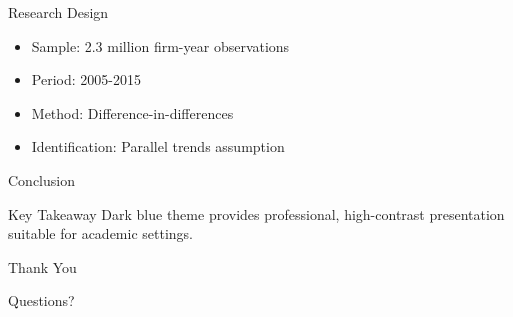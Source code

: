 \documentclass{beamer}
\begin{document}
\begin{frame}{Research Design}
  \begin{itemize}
    \item Sample: 2.3 million firm-year observations
    \item Period: 2005-2015
    \item Method: Difference-in-differences
    \item Identification: Parallel trends assumption
  \end{itemize}
\end{frame}

\begin{frame}{Conclusion}
  \begin{block}{Key Takeaway}
    Dark blue theme provides professional, high-contrast presentation suitable for academic settings.
  \end{block}
\end{frame}

\begin{frame}
  \begin{center}
    \Large Thank You
    
    \vspace{1cm}
    
    \normalsize Questions?
  \end{center}
\end{frame}
\end{document}
